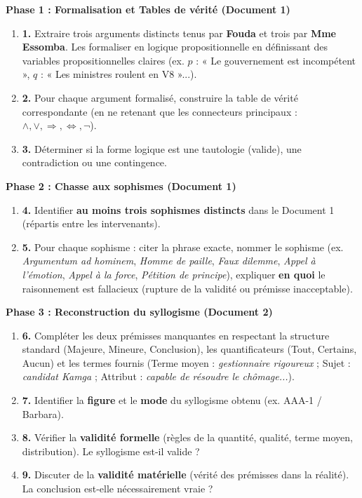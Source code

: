 \documentclass[11pt]{article}
\begin{document}
\textbf{Phase 1 : Formalisation et Tables de vérité (Document 1)}
\begin{enumerate}
    \item \textbf{1.} Extraire trois arguments distincts tenus par \textbf{Fouda} et trois par \textbf{Mme Essomba}. Les formaliser en logique propositionnelle en définissant des variables propositionnelles claires (ex. $p$ : « Le gouvernement est incompétent », $q$ : « Les ministres roulent en V8 »...).
    \item \textbf{2.} Pour chaque argument formalisé, construire la table de vérité correspondante (en ne retenant que les connecteurs principaux : $\land, \lor, \Rightarrow, \Leftrightarrow, \neg$).
    \item \textbf{3.} Déterminer si la forme logique est une tautologie (valide), une contradiction ou une contingence.
\end{enumerate}

\textbf{Phase 2 : Chasse aux sophismes (Document 1)}
\begin{enumerate}
    \item \textbf{4.} Identifier \textbf{au moins trois sophismes distincts} dans le Document 1 (répartis entre les intervenants).
    \item \textbf{5.} Pour chaque sophisme : citer la phrase exacte, nommer le sophisme (ex. \emph{Argumentum ad hominem}, \emph{Homme de paille}, \emph{Faux dilemme}, \emph{Appel à l'émotion}, \emph{Appel à la force}, \emph{Pétition de principe}), expliquer \textbf{en quoi} le raisonnement est fallacieux (rupture de la validité ou prémisse inacceptable).
\end{enumerate}

\textbf{Phase 3 : Reconstruction du syllogisme (Document 2)}
\begin{enumerate}
    \item \textbf{6.} Compléter les deux prémisses manquantes en respectant la structure standard (Majeure, Mineure, Conclusion), les quantificateurs (Tout, Certains, Aucun) et les termes fournis (Terme moyen : \emph{gestionnaire rigoureux} ; Sujet : \emph{candidat Kamga} ; Attribut : \emph{capable de résoudre le chômage...}).
    \item \textbf{7.} Identifier la \textbf{figure} et le \textbf{mode} du syllogisme obtenu (ex. AAA-1 / Barbara).
    \item \textbf{8.} Vérifier la \textbf{validité formelle} (règles de la quantité, qualité, terme moyen, distribution). Le syllogisme est-il valide ?
    \item \textbf{9.} Discuter de la \textbf{validité matérielle} (vérité des prémisses dans la réalité). La conclusion est-elle nécessairement vraie ?
\end{enumerate}
\end{document}
